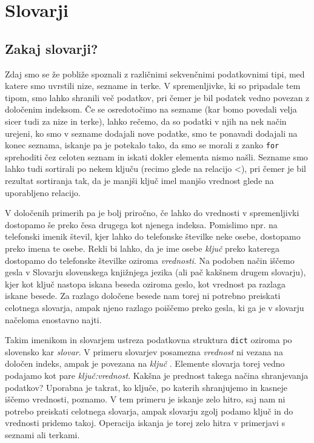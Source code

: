 \chapter{Slovarji}

\section{Zakaj slovarji?}

Zdaj smo se že pobliže spoznali z različnimi sekvenčnimi podatkovnimi tipi, med katere smo uvrstili nize, sezname in terke. V spremenljivke, ki so pripadale tem tipom, smo lahko shranili več podatkov, pri čemer je bil podatek vedno povezan z določenim indeksom. Če se osredotočimo na sezname (kar bomo povedali velja sicer tudi za nize in terke), lahko rečemo, da so podatki v njih na nek način urejeni, ko smo v sezname dodajali nove podatke, smo te ponavadi dodajali na konec seznama, iskanje pa je potekalo tako, da smo se morali z zanko \texttt{for} sprehoditi čez celoten seznam in iskati dokler elementa nismo našli. Sezname smo lahko tudi sortirali po nekem ključu (recimo glede na relacijo <), pri čemer je bil rezultat sortiranja tak, da je manjši ključ imel manjšo vrednost glede na uporabljeno relacijo. 

V določenih primerih pa je bolj priročno, če lahko do vrednosti v spremenljivki dostopamo še preko česa drugega kot njenega indeksa. Pomislimo npr. na telefonski imenik števil, kjer lahko do telefonske številke neke osebe, dostopamo preko imena te osebe. Rekli bi lahko, da je ime osebe \emph{ključ} preko katerega dostopamo do telefonske številke oziroma \emph{vrednosti}. Na podoben način iščemo gesla v Slovarju slovenskega knjižnjega jezika (ali pač kakšnem drugem slovarju), kjer kot ključ nastopa iskana beseda oziroma geslo, kot vrednost pa razlaga iskane besede. Za razlago določene besede nam torej ni potrebno preiskati celotnega slovarja, ampak njeno razlago poiščemo preko gesla, ki ga je v slovarju načeloma enostavno najti.

Takim imenikom in slovarjem ustreza podatkovna struktura \texttt{dict}  oziroma po slovensko kar \emph{slovar}. V primeru slovarjev posamezna \emph{vrednost}  ni vezana na določen indeks, ampak je povezana na  \emph{ključ} . Elemente slovarja torej vedno podajamo kot pare \emph{ključ:vrednost}. Kakšna je prednost takega načina shranjevanja podatkov? Uporabna je takrat, ko ključe, po katerih shranjujemo in kasneje iščemo vrednosti, poznamo. V tem primeru je iskanje zelo hitro, saj nam ni potrebo preiskati celotnega slovarja, ampak slovarju zgolj podamo ključ in do vrednosti pridemo takoj. Operacija iskanja je torej zelo hitra v primerjavi s seznami ali terkami.

